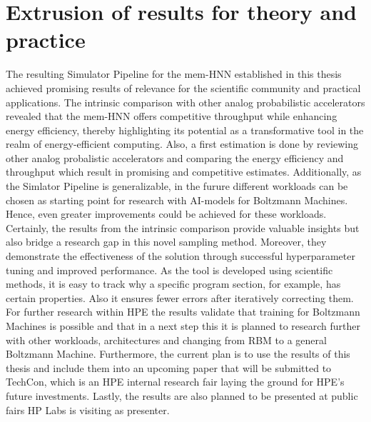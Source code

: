 \section{Extrusion of results for theory and practice}
The resulting Simulator Pipeline for the \ac{mem-HNN} established in this thesis achieved 
promising results of relevance for the scientific community and practical applications. 
The intrinsic comparison with other analog probabilistic accelerators revealed that the \ac{mem-HNN} offers competitive throughput while enhancing energy efficiency,
thereby highlighting its potential as a transformative tool in the realm of energy-efficient computing.
Also, a first estimation is done by reviewing other analog probalistic accelerators and comparing the energy efficiency and throughput which result in promising and competitive estimates. 
Additionally, as the Simlator Pipeline is generalizable, in the furure different workloads can be chosen as starting point for research with AI-models 
for Boltzmann Machines. 
Hence, even greater improvements could be achieved for these workloads.
Certainly, the results from the intrinsic comparison provide valuable insights but also bridge a research gap in this novel sampling method.
Moreover, they demonstrate the effectiveness of the solution through successful hyperparameter tuning and improved performance.
As the tool is developed using scientific methods, it is easy to track why a  specific program section, for example, has certain properties.
Also it ensures fewer errors after iteratively correcting them.
For further research within HPE the results validate that training for Boltzmann Machines is possible and that in 
a next step this it is planned to research further with other workloads, architectures and changing from \ac{RBM} to a general Boltzmann Machine.
Furthermore, the current plan is to use the results of this thesis and include them into an upcoming paper 
that will be submitted to TechCon, which is an HPE internal research fair laying the ground for HPE's future investments.
Lastly, the results are also planned to be presented at public fairs HP Labs is visiting as presenter. 

